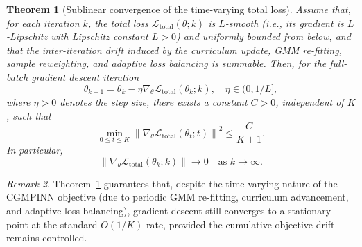 \documentclass{article}
\theoremstyle{plain}
\newtheorem{theorem}{Theorem}[section]
\theoremstyle{definition}
\theoremstyle{remark}
\newtheorem{remark}[theorem]{Remark}
\begin{document}
\begin{theorem}[Sublinear convergence of the time-varying total loss]
	\label{thm:main_nonconvex}
	Assume that, for each iteration $k$, the total loss
	$\mathcal{L}_{\mathrm{total}}(\theta;k)$ is $L$-smooth (i.e., its
	gradient is $L$-Lipschitz with Lipschitz constant $L>0$) and uniformly
	bounded from below, and that the inter-iteration drift induced by the
	curriculum update, GMM re-fitting, sample reweighting, and adaptive
	loss balancing is summable.
	Then, for the full-batch gradient descent iteration
	\begin{equation}
		\theta_{k+1}
		=
		\theta_k
		-
		\eta \nabla_{\theta}\mathcal{L}_{\mathrm{total}}(\theta_k;k),
		\quad
		\eta\in(0,1/L],
		\label{eq:main_gd_update}
	\end{equation}
	where $\eta>0$ denotes the step size,
	there exists a constant $C>0$, independent of $K$, such that
	\begin{equation}
		\min_{0\leqslant t\leqslant K}
		\left\|
		\nabla_{\theta}\mathcal{L}_{\mathrm{total}}(\theta_t;t)
		\right\|^2
		\leqslant
		\frac{C}{K+1}.
		\label{eq:main_sublinear_rate}
	\end{equation}
	In particular,
	\begin{equation}
		\left\|
		\nabla_{\theta}\mathcal{L}_{\mathrm{total}}(\theta_k;k)
		\right\|\to 0
		\quad \text{as } k\to\infty.
		\label{eq:main_stationarity}
	\end{equation}
\end{theorem}

\begin{remark}
	Theorem~\ref{thm:main_nonconvex} guarantees that, despite the time-varying nature of the CGMPINN objective (due to periodic GMM re-fitting, curriculum advancement, and adaptive loss balancing), gradient descent still converges to a stationary point at the standard $O(1/K)$ rate, provided the cumulative objective drift remains controlled.
\end{remark}
\end{document}
